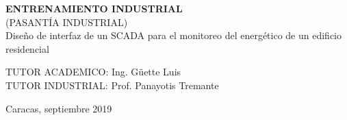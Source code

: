 
\begin{center}
    \textbf{ENTRENAMIENTO INDUSTRIAL}\\
    (PASANTÍA INDUSTRIAL)\\

    \vspace{6cm}
    Diseño de interfaz de un SCADA para el monitoreo del 
    energético de un edificio residencial
\end{center}    
    \vspace{6cm}
    \hspace{6cm}TUTOR ACADEMICO: Ing. Güette Luis\\
    \hspace{6cm}TUTOR INDUSTRIAL: Prof. Panayotis Tremante\\

    \vspace{4cm}
    \begin{center}
        Caracas, septiembre 2019
    \end{center}
    \thispagestyle{empty} 
    \newpage